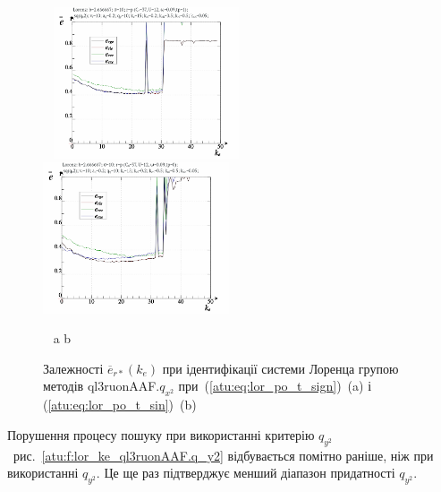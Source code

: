 \begin{figure}[ht!]
  \begin{center}
    ~ \hfill
    \includegraphics[width=0.49\textwidth]{p/cha/lor/ql3ruonAAF/lor_ql3ruonAAF_qx2-p_k_e_e_sign.png}
    \hfill
    \includegraphics[width=0.49\textwidth]{p/cha/lor/ql3ruonAAF/lor_ql3ruonAAF_qx2-p_k_e_e_sin.png}
    \hfill ~
  \end{center}
  \vspace{-1.0ex}
  \begin{center}
    ~ \hfill a \hfill\hfill b \hfill ~
  \end{center}
  \vspace{-1.5ex}
  \caption{Залежності $ \overline{e}_{r *} (k_e) $ при ідентифікації системи Лоренца групою методів ql3ruonAAF.$q_{x^2} $ при~(\ref{atu:eq:lor_po_t_sign})~(a) і (\ref{atu:eq:lor_po_t_sin})~(b)}
\label{atu:f:lor_ke_ql3ruonAAF.q_x2}
\end{figure}

Порушення процесу пошуку при використанні критерію
$ q_{y^2} $~рис.~\ref{atu:f:lor_ke_ql3ruonAAF.q_y2} відбувається помітно раніше,
ніж при використанні
$ q_{y^2} $. Це ще раз підтверджує менший діапазон придатності
$ q_{y^2} $.

